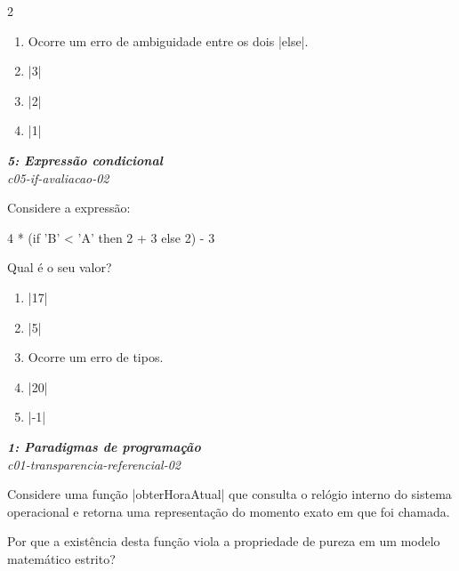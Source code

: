 \documentclass[a4paper,10pt,brazil]{article}
\begin{document}
\begin{multicols}{2}
\begin{enumerate}
  \item Ocorre um erro de ambiguidade entre os dois \haskellinline|else|.

  \item \haskellinline|3|

  \item \haskellinline|2|

  \item \haskellinline|1|


\end{enumerate}

\begin{flushright}
  \footnotesize
  \textit{\textbf{5: Expressão condicional}}\\
  \textit{c05-if-avaliacao-02}\\

\end{flushright}
Considere a expressão:
\begin{haskellcode}
4 * (if 'B' < 'A' then 2 + 3 else 2) - 3
\end{haskellcode}
Qual é o seu valor?

\begin{enumerate}
  \item \haskellinline|17|

  \item \haskellinline|5|

  \item Ocorre um erro de tipos.

  \item \haskellinline|20|

  \item \haskellinline|-1|


\end{enumerate}

\begin{flushright}
  \footnotesize
  \textit{\textbf{1: Paradigmas de programação}}\\
  \textit{c01-transparencia-referencial-02}\\

\end{flushright}
Considere uma função \haskellinline|obterHoraAtual| que consulta o relógio interno do sistema operacional e retorna uma representação do momento exato em que foi chamada.

Por que a existência desta função viola a propriedade de pureza em um modelo matemático estrito?


\end{multicols}
\end{document}
